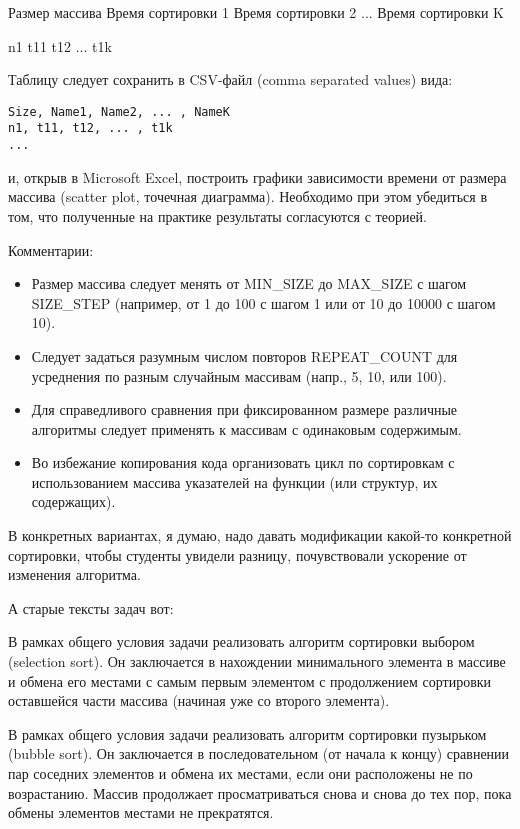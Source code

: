 Размер массива	Время сортировки 1	Время сортировки 2	...	Время сортировки K

n1	t11	t12	...	t1k

Таблицу следует сохранить в CSV-файл (comma separated values) вида:

\begin{verbatim}
Size, Name1, Name2, ... , NameK
n1, t11, t12, ... , t1k
...
\end{verbatim}

и, открыв в Microsoft Excel, построить графики зависимости времени от размера массива (scatter plot, точечная диаграмма). Необходимо при этом убедиться в том, что полученные на практике результаты согласуются с теорией.

Комментарии:
%
\begin{itemize}
\item Размер массива следует менять от MIN\_SIZE до MAX\_SIZE с шагом SIZE\_STEP (например, от 1 до 100 с шагом 1 или от 10 до 10000 с шагом 10).
\item Следует задаться разумным числом повторов REPEAT\_COUNT для усреднения по разным случайным массивам (напр., 5, 10, или 100).
\item Для справедливого сравнения при фиксированном размере различные алгоритмы следует применять к массивам с одинаковым содержимым.
\item Во избежание копирования кода организовать цикл по сортировкам с использованием массива указателей на функции (или структур, их содержащих).
\end{itemize}

В конкретных вариантах, я думаю, надо давать модификации какой-то конкретной
сортировки, чтобы студенты увидели разницу, почувствовали ускорение от изменения алгоритма.

А старые тексты задач вот:

\begin{zztask}
В рамках общего условия задачи реализовать алгоритм 
сортировки выбором (selection sort). Он заключается в нахождении минимального элемента
в массиве и обмена его местами с самым первым элементом с продолжением сортировки оставшейся
части массива (начиная уже со второго элемента).
\end{zztask}

\begin{zztask}
В рамках общего условия задачи реализовать алгоритм 
сортировки пузырьком (bubble sort). Он заключается в последовательном (от начала к концу)
сравнении пар соседних элементов и обмена их местами, если они расположены 
не по возрастанию. Массив продолжает просматриваться снова и снова до 
тех пор, пока обмены элементов местами не прекратятся.
\end{zztask}

